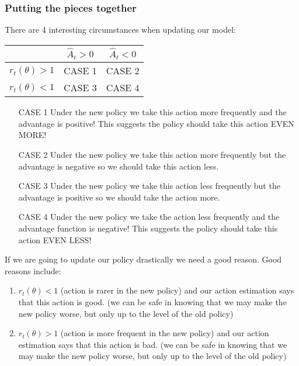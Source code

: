 \documentclass{article}
\begin{document}
\subsubsection{Putting the pieces together}

There are 4 interesting circumstances when updating our model:


\begin{center}
    \begin{tabular}{ c|c|c| } 
    & \(\hat{A}_{t} > 0\)  & \(\hat{A}_{t} < 0\)  \\
    \hline
    \(r_t (\theta) > 1 \) & CASE 1  & CASE 2 \\
    \hline
    \(r_t (\theta) < 1 \) & CASE 3  & CASE 4
\end{tabular}
\end{center}

\begin{itemize}
    \item[CASE 1] Under the new policy we take this action more frequently and the advantage is positive! This suggests the policy should take this action EVEN MORE!
    \item[CASE 2] Under the new policy we take this action more frequently but the advantage is negative so we should take this action less.
    \item[CASE 3] Under the new policy we take this action less frequently but the advantage is positive so we should take the action more.
    \item[CASE 4] Under the new policy we take the action less frequently and the advantage function is negative! This suggests the policy should take this action EVEN LESS!
\end{itemize}

    

If we are going to update our policy drastically we need a good reason. Good reasons include:
\begin{enumerate}
    \item \(r_t(\theta) < 1 \) (action is rarer in the new policy) and our action estimation says that this action is good. (we can be safe in knowing that we may make the new policy worse, but only up to the level of the old policy)
    \item \(r_t(\theta) > 1 \) (action is more frequent in the new policy) and our action estimation says that this action is bad. (we can be safe in knowing that we may make the new policy worse, but only up to the level of the old policy)
\end{enumerate}
\end{document}
